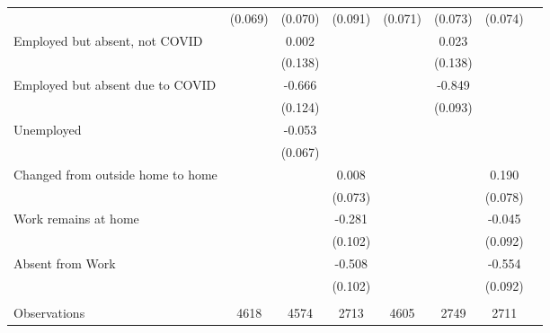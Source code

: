 \begin{tabular*}{\textwidth}{ @{\extracolsep{\fill}}l*{7}{c}}
                                                  &  (0.069)&  (0.070)&  (0.091)&  (0.071)&  (0.073)&  (0.074)\\[0.5em]
Employed but absent, not COVID                    &         &    0.002&         &         &    0.023&         \\
                                                  &         &  (0.138)&         &         &  (0.138)&         \\[0.5em]
Employed but absent due to COVID                  &         &   -0.666&         &         &   -0.849&         \\
                                                  &         &  (0.124)&         &         &  (0.093)&         \\[0.5em]
Unemployed                                        &         &   -0.053&         &         &         &         \\
                                                  &         &  (0.067)&         &         &         &         \\[0.5em]
Changed from outside home to home                 &         &         &    0.008&         &         &    0.190\\
                                                  &         &         &  (0.073)&         &         &  (0.078)\\[0.5em]
Work remains at home                              &         &         &   -0.281&         &         &   -0.045\\
                                                  &         &         &  (0.102)&         &         &  (0.092)\\[0.5em]
Absent from Work                                  &         &         &   -0.508&         &         &   -0.554\\
                                                  &         &         &  (0.102)&         &         &  (0.092)\\
\\
Observations                                      &     4618&     4574&     2713&     4605&     2749&     2711\\
\hline \hline
\end{tabular*}
